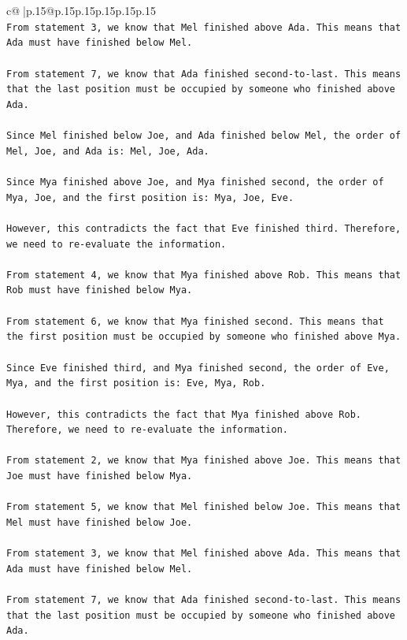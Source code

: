 \documentclass{article}
\begin{document}
{\begin{supertabular}{c@{$\;$}|p{.15\linewidth}@{}p{.15\linewidth}p{.15\linewidth}p{.15\linewidth}p{.15\linewidth}p{.15\linewidth}}
{{{\\ 
\texttt{From statement 3, we know that Mel finished above Ada. This means that Ada must have finished below Mel.} \\
\\ 
\texttt{From statement 7, we know that Ada finished second{-}to{-}last. This means that the last position must be occupied by someone who finished above Ada.} \\
\\ 
\texttt{Since Mel finished below Joe, and Ada finished below Mel, the order of Mel, Joe, and Ada is: Mel, Joe, Ada.} \\
\\ 
\texttt{Since Mya finished above Joe, and Mya finished second, the order of Mya, Joe, and the first position is: Mya, Joe, Eve.} \\
\\ 
\texttt{However, this contradicts the fact that Eve finished third. Therefore, we need to re{-}evaluate the information.} \\
\\ 
\texttt{From statement 4, we know that Mya finished above Rob. This means that Rob must have finished below Mya.} \\
\\ 
\texttt{From statement 6, we know that Mya finished second. This means that the first position must be occupied by someone who finished above Mya.} \\
\\ 
\texttt{Since Eve finished third, and Mya finished second, the order of Eve, Mya, and the first position is: Eve, Mya, Rob.} \\
\\ 
\texttt{However, this contradicts the fact that Mya finished above Rob. Therefore, we need to re{-}evaluate the information.} \\
\\ 
\texttt{From statement 2, we know that Mya finished above Joe. This means that Joe must have finished below Mya.} \\
\\ 
\texttt{From statement 5, we know that Mel finished below Joe. This means that Mel must have finished below Joe.} \\
\\ 
\texttt{From statement 3, we know that Mel finished above Ada. This means that Ada must have finished below Mel.} \\
\\ 
\texttt{From statement 7, we know that Ada finished second{-}to{-}last. This means that the last position must be occupied by someone who finished above Ada.} \\
}}}
\end{supertabular}}
\end{document}
